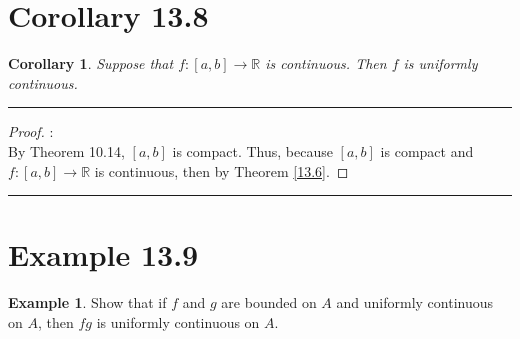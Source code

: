 \documentclass[openany, amssymb, psamsfonts]{amsart}
\newcommand{\bbR}{\mathbb{R}}
\newtheorem{cor}{Corollary}[section]
\theoremstyle{definition}
\newtheorem{exmp}{Example}[section]
\numberwithin{equation}{section}
\begin{document}
\section*{Corollary 13.8}
\begin{cor}
Suppose that $f\colon [a, b] \to \bbR$ is continuous. Then $f$ is uniformly continuous.
\end{cor}
\vspace{4pt}     \hrule   \vspace{4pt} \begin{proof}:\\
By Theorem 10.14, $[a,b]$ is compact. Thus, because $[a,b]$ is compact and $f: [a,b]\to \bbR$ is continuous, then by Theorem \ref{13.6}.
\end{proof} \vspace{4pt}     \hrule   \vspace{4pt}

\section*{Example 13.9}
\begin{exmp}
	Show that if $f$ and $g$ are bounded on $A$ and uniformly continuous on $A$, 
	then $fg$ is uniformly continuous on $A$.
\end{exmp}
\end{document}
